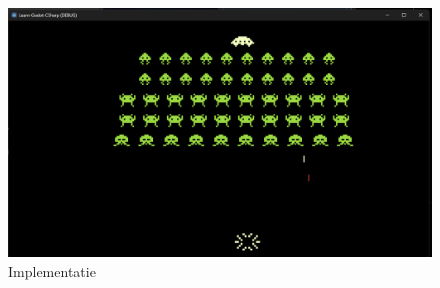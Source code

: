 \begin{figure}[h]
    \centering
    \includegraphics[width=1\textwidth]{ImplementatieSpel.png}
    \caption{Implementatie}
    \label{fig:POC}
\end{figure}

